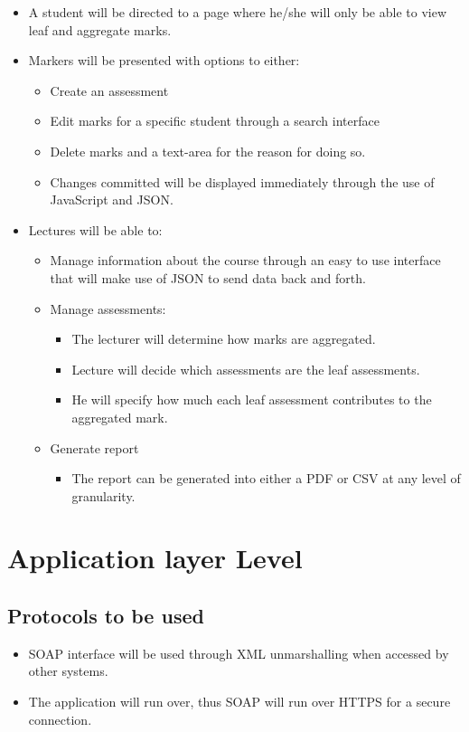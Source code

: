 \documentclass[12pt,a4paper]{article}
\begin{document}
\begin{itemize}
\item A student will be directed to a page where he/she will only be able to view leaf and aggregate marks.
\item Markers will be presented with options to either:
\begin{itemize}
\item Create an assessment 
\item Edit marks for a specific student through a search interface
\item Delete marks and a text-area for the reason for doing so.
\item Changes committed will be displayed immediately through the use of JavaScript and JSON. 
\end{itemize}
\item Lectures will be able to:
\begin{itemize}
\item Manage information about the course through an easy to use interface that will make use of JSON to send data back and forth. 
\item Manage assessments:
\begin{itemize}
\item The lecturer will determine how marks are aggregated.
\item Lecture will decide which assessments are the leaf assessments.
\item He will specify how much each leaf assessment contributes to the aggregated mark.
\end{itemize}
\item Generate report
\begin{itemize}
\item The report can be generated into either a PDF or CSV at any level of granularity.
\end{itemize}
\end{itemize}
\end{itemize}
\section{Application layer Level}
\subsection{Protocols to be used}
\begin{itemize}
\item SOAP interface will be used through XML unmarshalling when accessed by other systems.
\item The application will run over, thus SOAP will run over HTTPS for a secure connection.
\end{itemize}
\end{document}
